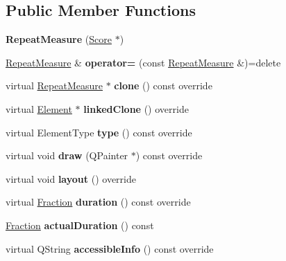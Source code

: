 \subsection*{Public Member Functions}
\begin{DoxyCompactItemize}
\item 
\mbox{\label{class_ms_1_1_repeat_measure_aa9c4c11fb8b966ec9303699d04bfc87e}} 
{\bfseries Repeat\+Measure} (\hyperlink{class_ms_1_1_score}{Score} $\ast$)
\item 
\mbox{\label{class_ms_1_1_repeat_measure_a5f953582ca4f83c47d3b326a9140a741}} 
\hyperlink{class_ms_1_1_repeat_measure}{Repeat\+Measure} \& {\bfseries operator=} (const \hyperlink{class_ms_1_1_repeat_measure}{Repeat\+Measure} \&)=delete
\item 
\mbox{\label{class_ms_1_1_repeat_measure_a5cf2a4015cfc6c561ead1ebdb20e2b35}} 
virtual \hyperlink{class_ms_1_1_repeat_measure}{Repeat\+Measure} $\ast$ {\bfseries clone} () const override
\item 
\mbox{\label{class_ms_1_1_repeat_measure_ae035f317554b229b9d2e7bd6e4c73183}} 
virtual \hyperlink{class_ms_1_1_element}{Element} $\ast$ {\bfseries linked\+Clone} () override
\item 
\mbox{\label{class_ms_1_1_repeat_measure_aba2e7d5b8c39c936e2a2fa7acfbd9258}} 
virtual Element\+Type {\bfseries type} () const override
\item 
\mbox{\label{class_ms_1_1_repeat_measure_ae275b4e3f66cd4463b50d0d1fddeae3c}} 
virtual void {\bfseries draw} (Q\+Painter $\ast$) const override
\item 
\mbox{\label{class_ms_1_1_repeat_measure_a2901d932c3b8e6372794783efd9f6197}} 
virtual void {\bfseries layout} () override
\item 
\mbox{\label{class_ms_1_1_repeat_measure_ae0b29646b5a920c9e6bf54208a694e60}} 
virtual \hyperlink{class_ms_1_1_fraction}{Fraction} {\bfseries duration} () const override
\item 
\mbox{\label{class_ms_1_1_repeat_measure_a99254207ede2a7f302e75759acaf961f}} 
\hyperlink{class_ms_1_1_fraction}{Fraction} {\bfseries actual\+Duration} () const
\item 
\mbox{\label{class_ms_1_1_repeat_measure_a9b6c0b9462a8678a15cfeda2e8f51b3e}} 
virtual Q\+String {\bfseries accessible\+Info} () const override
\end{DoxyCompactItemize}
